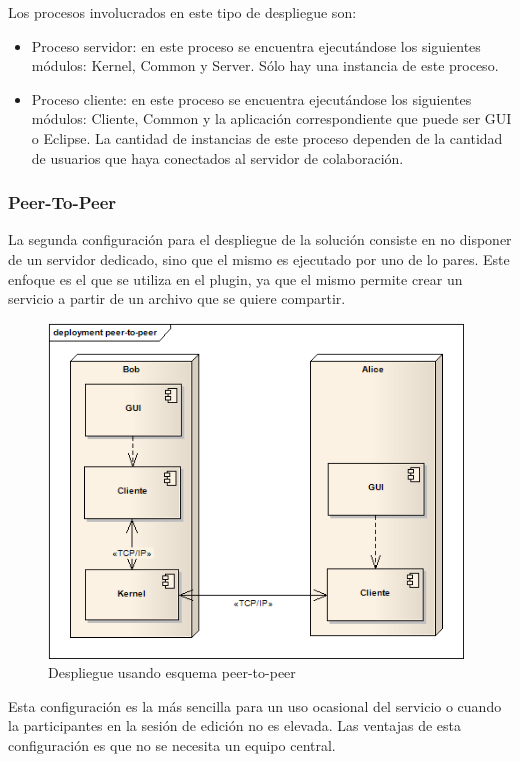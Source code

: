 \documentclass[12pt,a4paper]{article}
\begin{document}
Los procesos involucrados en este tipo de despliegue son:

\begin{itemize}
	\item Proceso servidor: en este proceso se encuentra ejecutándose los siguientes módulos: Kernel, Common y Server. Sólo
	hay una instancia de este proceso.
	\item Proceso cliente: en este proceso se encuentra ejecutándose los siguientes módulos: Cliente, Common y la aplicación
	correspondiente que puede ser GUI o Eclipse. La cantidad de instancias de este proceso dependen de la cantidad de usuarios que
	haya conectados al servidor de colaboración.
\end{itemize}

\subsubsection{Peer-To-Peer}
La segunda configuración para el despliegue de la solución consiste en no disponer de un servidor dedicado, sino que el
mismo es ejecutado por uno de lo pares. Este enfoque es el que se utiliza en el plugin, ya que el mismo permite crear un servicio
a partir de un archivo que se quiere compartir.

	\begin{figure}[!ht]
		\begin{center}
			\includegraphics[width=11cm]{peer-to-peer.png}
			\caption{\label{peer-to-peer} Despliegue usando esquema peer-to-peer }
		\end{center}
	\end{figure}

Esta configuración es la más sencilla para un uso ocasional del servicio o cuando la participantes en la sesión de edición no
es elevada. Las ventajas de esta configuración es que no se necesita un equipo central.
\end{document}
